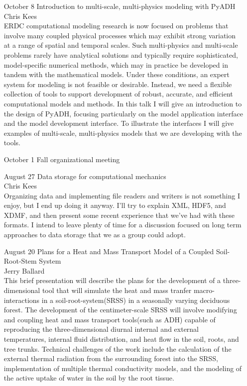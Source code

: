 \documentclass[12]{article}
\begin{document}
\begin{enumerate}
\item[October 8] Introduction to multi-scale, multi-physics modeling with PyADH\\
Chris Kees\\
ERDC computational modeling research is now focused on
problems that involve many coupled physical processes which may
exhibit strong variation at a range of spatial and temporal
scales. Such multi-physics and multi-scale problems rarely have
analytical solutions and typically require sophisticated,
model-specific numerical methods, which may in practice be developed in
tandem with the mathematical models. Under these conditions, an
expert system for modeling is not feasible or desirable. Instead,
we need a flexible collection of tools to support development of
robust, accurate, and efficient computational models and methods.  In
this talk I will give an introduction to the design of PyADH, focusing
particularly on the model application interface and the model
development interface. To illustrate the interfaces I will give
examples of multi-scale, multi-physics models that we are developing
with the tools.

\item[October 1] Fall organizational meeting

\item[August 27] Data storage for computational mechanics\\
  Chris Kees\\
  Organizing data and implementing file readers and writers is not
  something I enjoy, but I end up doing it anyway.  I'll try to
  explain XML, HDF5, and XDMF, and then present some recent experience
  that we've had with these formats.  I intend to leave plenty of time
  for a discussion focused on long term approaches to data storage
  that we as a group could adopt.

\item[August 20] Plans for a Heat and Mass Transport Model of a Coupled Soil-Root-Stem System\\
  Jerry Ballard\\
  This brief presentation will describe the plans for the development
  of a three-dimensional tool that will simulate the heat and mass
  tranfer macro-interactions in a soil-root-system(SRSS) in a
  seasonally varying deciduous forest.  The development of the
  centimeter-scale SRSS will involve modifying and coupling heat and
  mass transport tools(such as ADH) capable of reproducing the
  three-dimensional diurnal internal and external temperatures,
  internal fluid distribution, and heat flow in the soil, roots, and
  tree trunks.  Technical challenges of the work include the
  calculation of the external thermal radiation from the surrounding
  forest into the SRSS, implementation of multiple thermal
  conductivity models, and the modeling of the active uptake of water
  in the soil by the root tissue.


\end{enumerate}
\end{document}
